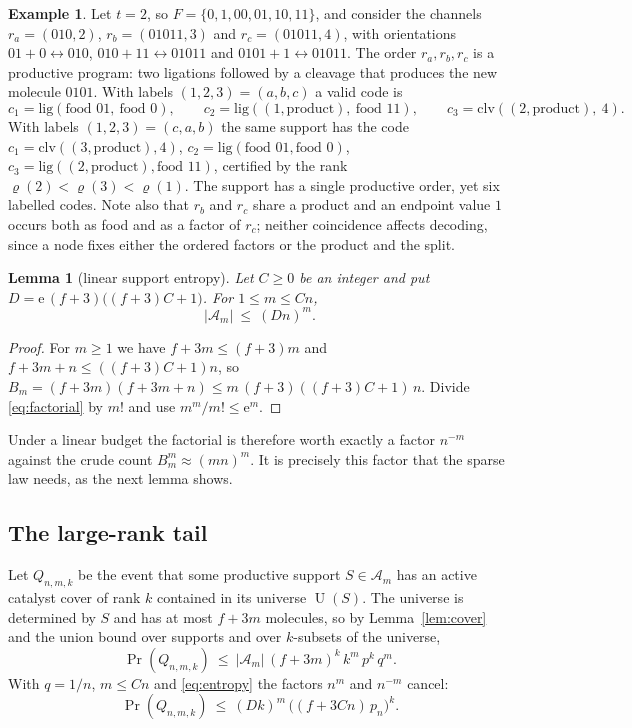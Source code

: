 \documentclass[11pt,a4paper]{article}
\theoremstyle{plain}
\newtheorem{lemma}[theorem]{Lemma}
\theoremstyle{definition}
\newtheorem{example}[theorem]{Example}
\theoremstyle{remark}
\newcommand{\cA}{\mathcal A}
\newcommand{\Uni}{\operatorname{U}}
\newcommand{\ee}{\mathrm e}
\begin{document}
\begin{example}\label{ex:code}
Let $t=2$, so $F=\{0,1,00,01,10,11\}$, and consider the channels $r_a=(010,2)$, $r_b=(01011,3)$ and $r_c=(01011,4)$, with orientations $01+0\leftrightarrow010$, $010+11\leftrightarrow01011$ and $0101+1\leftrightarrow01011$. The order $r_a,r_b,r_c$ is a productive program: two ligations followed by a cleavage that produces the new molecule $0101$. With labels $(1,2,3)=(a,b,c)$ a valid code is
\[
c_1=\text{lig}(\text{food }01,\ \text{food }0),\qquad c_2=\text{lig}((1,\text{product}),\ \text{food }11),\qquad c_3=\text{clv}((2,\text{product}),\ 4).
\]
With labels $(1,2,3)=(c,a,b)$ the same support has the code $c_1=\text{clv}((3,\text{product}),4)$, $c_2=\text{lig}(\text{food }01,\text{food }0)$, $c_3=\text{lig}((2,\text{product}),\text{food }11)$, certified by the rank $\varrho(2)<\varrho(3)<\varrho(1)$. The support has a single productive order, yet six labelled codes. Note also that $r_b$ and $r_c$ share a product and an endpoint value $1$ occurs both as food and as a factor of $r_c$; neither coincidence affects decoding, since a node fixes either the ordered factors or the product and the split.
\end{example}

\begin{lemma}[linear support entropy]\label{lem:entropy}
Let $C\ge0$ be an integer and put $D=\ee\,(f+3)\bigl((f+3)C+1\bigr)$. For $1\le m\le Cn$,
\begin{equation}\label{eq:entropy}
|\cA_m|\ \le\ (Dn)^m .
\end{equation}
\end{lemma}

\begin{proof}
For $m\ge1$ we have $f+3m\le(f+3)m$ and $f+3m+n\le((f+3)C+1)n$, so $B_m=(f+3m)(f+3m+n)\le m\,(f+3)((f+3)C+1)\,n$. Divide \eqref{eq:factorial} by $m!$ and use $m^m/m!\le\ee^m$.
\end{proof}

Under a linear budget the factorial is therefore worth exactly a factor $n^{-m}$ against the crude count $B_m^m\approx(mn)^m$. It is precisely this factor that the sparse law needs, as the next lemma shows.

\subsection{The large-rank tail}

Let $Q_{n,m,k}$ be the event that some productive support $S\in\cA_m$ has an active catalyst cover of rank $k$ contained in its universe $\Uni(S)$. The universe is determined by $S$ and has at most $f+3m$ molecules, so by Lemma~\ref{lem:cover} and the union bound over supports and over $k$-subsets of the universe,
\begin{equation}\label{eq:Q}
\Pr(Q_{n,m,k})\ \le\ |\cA_m|\,(f+3m)^k\,k^m\,p^k\,q^m .
\end{equation}
With $q=1/n$, $m\le Cn$ and \eqref{eq:entropy} the factors $n^m$ and $n^{-m}$ cancel:
\begin{equation}\label{eq:Q2}
\Pr(Q_{n,m,k})\ \le\ (Dk)^m\,\bigl((f+3Cn)\,p_n\bigr)^k .
\end{equation}
\end{document}
